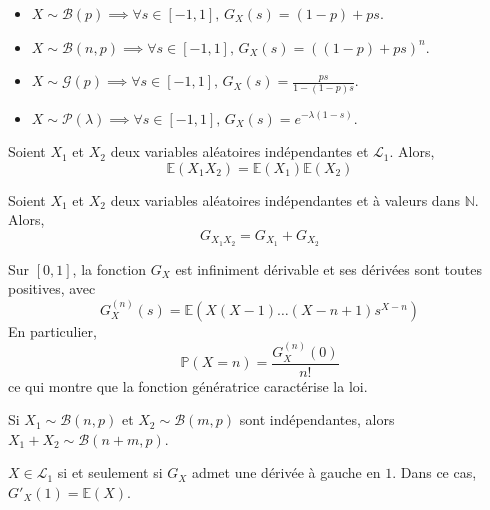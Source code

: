 
  \begin{example}
    \begin{itemize}
      \item $X \sim \mathcal{B}(p) \implies \forall s \in [-1,1], \, G_X(s) = (1-p) + ps$.
      \item $X \sim \mathcal{B}(n, p) \implies \forall s \in [-1,1], \, G_X(s) = ((1-p) + ps)^n$.
      \item $X \sim \mathcal{G}(p) \implies \forall s \in [-1,1], \, G_X(s) = \frac{ps}{1-(1-p)s}$.
      \item $X \sim \mathcal{P}(\lambda) \implies \forall s \in [-1,1], \, G_X(s) = e^{-\lambda (1-s)}$.
    \end{itemize}
  \end{example}

  \begin{theorem}
    Soient $X_1$ et $X_2$ deux variables aléatoires indépendantes et $\mathcal{L}_1$. Alors,
    \[ \mathbb{E}(X_1 X_2) = \mathbb{E}(X_1) \mathbb{E}(X_2) \]
  \end{theorem}

  \begin{corollary}
    Soient $X_1$ et $X_2$ deux variables aléatoires indépendantes et à valeurs dans $\mathbb{N}$. Alors,
    \[ G_{X_1 X_2} = G_{X_1} + G_{X_2} \]
  \end{corollary}

  \begin{theorem}
    Sur $[0,1]$, la fonction $G_X$ est infiniment dérivable et ses dérivées sont toutes positives, avec
    \[ G_X^{(n)}(s) = \mathbb{E}(X(X-1) \dots (X-n+1)s^{X-n}) \]
    En particulier,
    \[ \mathbb{P}(X=n) = \frac{G_X^{(n)}(0)}{n!} \]
    ce qui montre que la fonction génératrice caractérise la loi.
  \end{theorem}


  \begin{example}
    Si $X_1 \sim \mathcal{B}(n, p)$ et $X_2 \sim \mathcal{B}(m, p)$ sont indépendantes, alors $X_1 + X_2 \sim \mathcal{B}(n + m, p)$.
  \end{example}


  \begin{theorem}
    $X \in \mathcal{L}_1$ si et seulement si $G_X$ admet une dérivée à gauche en $1$. Dans ce cas, $G'_X(1) = \mathbb{E}(X)$.
  \end{theorem}

